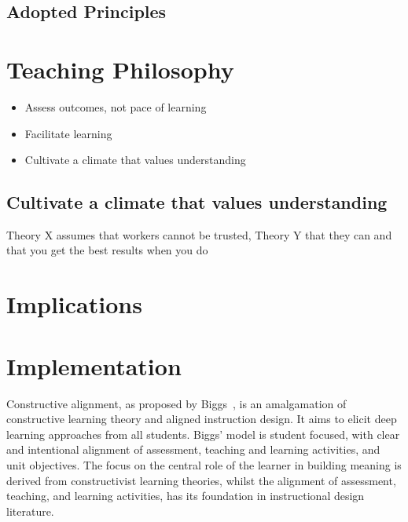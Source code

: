 

\subsection{Adopted Principles} %
\label{sub:adopted_principles}






\section{Teaching Philosophy} %
\label{sec:teaching_philosophy}

\begin{itemize}
	\item Assess outcomes, not pace of learning
	\item Facilitate learning 
	\item Cultivate a climate that values understanding
\end{itemize}


\subsection{Cultivate a climate that values understanding} %
\label{sub:cultivate_a_climate_that_values_understanding}

\citet{McGregor:1960}

Theory X assumes that workers cannot be trusted, Theory Y that they can and that you get the best results when you do




\section{Implications} %
\label{sec:implications}


\section{Implementation} %
\label{sec:design}

Constructive alignment, as proposed by Biggs~\cite{Biggs:1996c}, is an amalgamation of constructive learning theory and aligned instruction design. It aims to elicit deep learning approaches from all students. Biggs' model is student focused, with clear and intentional alignment of assessment, teaching and learning activities, and unit objectives. The focus on the central role of the learner in building meaning is derived from constructivist learning theories, whilst the alignment of assessment, teaching, and learning activities, has its foundation in instructional design literature. 


